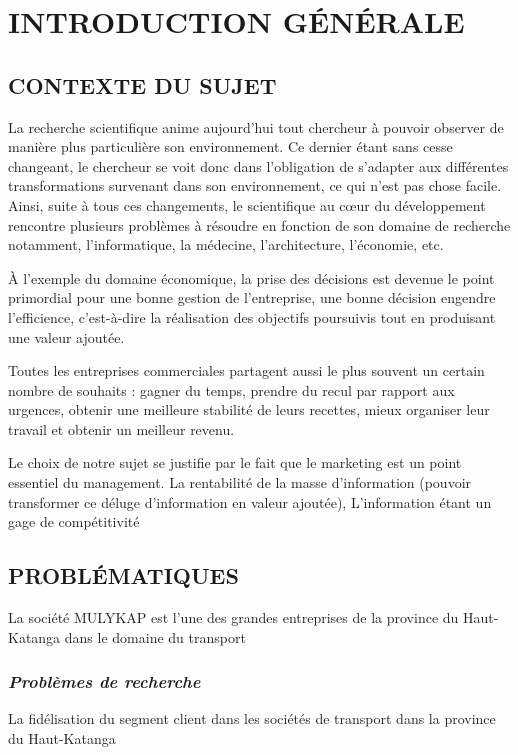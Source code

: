 \chapter*{INTRODUCTION GÉNÉRALE}
    \section[Context du sujet]{CONTEXTE DU SUJET}
    La recherche scientifique anime aujourd’hui tout chercheur
    à pouvoir observer de manière
    plus particulière son environnement. Ce dernier étant
    sans cesse changeant, le chercheur se voit donc
    dans l’obligation de s’adapter aux différentes transformations
    survenant dans son environnement, ce qui n’est pas chose facile.
    Ainsi, suite à tous ces changements, le scientifique au cœur du
    développement rencontre plusieurs problèmes à résoudre en
    fonction de son domaine de recherche notamment, l’informatique,
    la médecine, l’architecture, l’économie, etc.
    \newline

    À l’exemple du domaine
    économique, la prise des décisions est devenue
    le point primordial pour une bonne gestion de
    l’entreprise, une bonne décision engendre l’efficience,
    c’est-à-dire la réalisation des objectifs
    poursuivis tout en produisant une valeur ajoutée.
    \newline

    Toutes les entreprises commerciales partagent aussi
    le plus souvent un certain nombre de souhaits : gagner
    du temps, prendre du recul par rapport aux urgences, obtenir une meilleure
    stabilité de leurs recettes, mieux organiser leur travail et obtenir un meilleur
    revenu. \cite*{Barouch2010}
    \newline

    Le choix de notre sujet se justifie par le fait que le marketing
    est un point essentiel du management.
    La rentabilité de la masse d’information (pouvoir transformer
    ce déluge d’information en valeur ajoutée), L’information étant
    un gage de compétitivité %

    \section[Problématique]{PROBLÉMATIQUES}
    La société MULYKAP est l’une des grandes entreprises
    de la province du Haut-Katanga dans le domaine du transport
        \subsection[Problèmes de recherche]{\textit{Problèmes de recherche}}
        La fidélisation du segment client dans les sociétés de transport
        dans la province du Haut-Katanga

